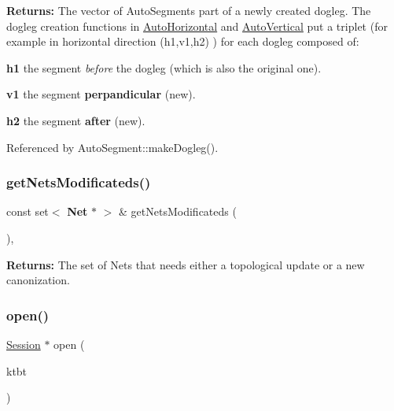 {\bfseries Returns\+:} The vector of Auto\+Segments part of a newly created dogleg. The dogleg creation functions in \mbox{\hyperlink{classKatabatic_1_1AutoHorizontal}{Auto\+Horizontal}} and \mbox{\hyperlink{classKatabatic_1_1AutoVertical}{Auto\+Vertical}} put a triplet (for example in horizontal direction {\ttfamily }(h1,v1,h2) ) for each dogleg composed of\+:
\begin{DoxyItemize}
\item {\bfseries h1} the segment {\itshape before} the dogleg (which is also the original one).
\item {\bfseries v1} the segment {\bfseries perpandicular} (new).
\item {\bfseries h2} the segment {\bfseries after} (new). 
\end{DoxyItemize}

Referenced by Auto\+Segment\+::make\+Dogleg().

\mbox{\label{classKatabatic_1_1Session_a6c3be93d98029b06138f633342d04157}} 
\subsubsection{\texorpdfstring{get\+Nets\+Modificateds()}{getNetsModificateds()}}
{\footnotesize\ttfamily const set$<$ \textbf{ Net} $\ast$ $>$ \& get\+Nets\+Modificateds (\begin{DoxyParamCaption}{ }\end{DoxyParamCaption})\hspace{0.3cm}{\ttfamily [inline]}, {\ttfamily [static]}}

{\bfseries Returns\+:} The set of Nets that needs either a topological update or a new canonization. \mbox{\label{classKatabatic_1_1Session_a000e098850f6cccff6b289a294149a41}} 
\subsubsection{\texorpdfstring{open()}{open()}}
{\footnotesize\ttfamily \mbox{\hyperlink{classKatabatic_1_1Session}{Session}} $\ast$ open (\begin{DoxyParamCaption}\item[{\mbox{\hyperlink{classKatabatic_1_1KatabaticEngine}{Katabatic\+Engine}} $\ast$}]{ktbt }\end{DoxyParamCaption})\hspace{0.3cm}{\ttfamily [static]}}

